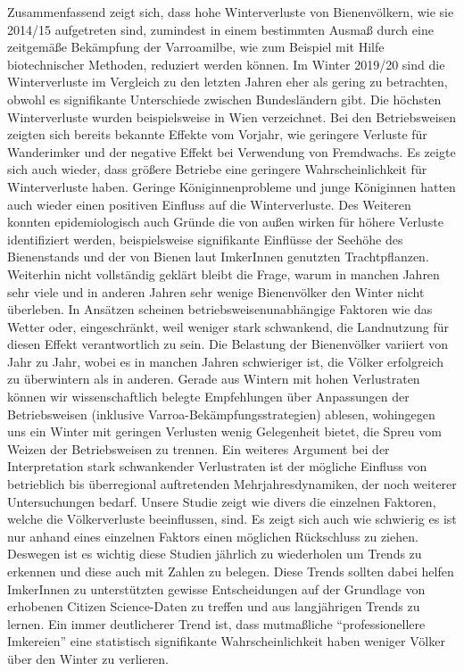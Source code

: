 Zusammenfassend zeigt sich, dass hohe Winterverluste von Bienenvölkern, wie sie 2014/15 aufgetreten sind, zumindest in einem bestimmten Ausmaß durch eine zeitgemäße Bekämpfung der Varroamilbe, wie zum Beispiel mit Hilfe biotechnischer Methoden, reduziert werden können.
\newline
Im Winter 2019/20 sind die Winterverluste im Vergleich zu den letzten Jahren eher als gering zu betrachten, obwohl es signifikante Unterschiede zwischen Bundesländern gibt. Die höchsten Winterverluste wurden beispielsweise in Wien verzeichnet. Bei den Betriebsweisen zeigten sich bereits bekannte Effekte vom Vorjahr, wie geringere Verluste für Wanderimker und der negative Effekt bei Verwendung von Fremdwachs. Es zeigte sich auch wieder, dass größere Betriebe eine geringere Wahrscheinlichkeit für Winterverluste haben.
\newline
Geringe Königinnenprobleme und junge Königinnen hatten auch wieder einen positiven Einfluss auf die Winterverluste. Des Weiteren konnten epidemiologisch auch Gründe die von außen wirken für höhere Verluste identifiziert werden, beispielsweise signifikante Einflüsse der Seehöhe des Bienenstands und der von Bienen laut ImkerInnen genutzten Trachtpflanzen.
\newline
Weiterhin nicht vollständig geklärt bleibt die Frage, warum in manchen Jahren sehr viele und in anderen Jahren sehr wenige Bienenvölker den Winter nicht überleben. In Ansätzen scheinen betriebsweisenunabhängige Faktoren wie das Wetter \citep{switanek2017} oder, eingeschränkt, weil weniger stark schwankend, die Landnutzung \citep{kuchling2018} für diesen Effekt verantwortlich zu sein.
\newline
Die Belastung der Bienenvölker variiert von Jahr zu Jahr, wobei es in manchen Jahren schwieriger ist, die Völker erfolgreich zu überwintern als in anderen. Gerade aus Wintern mit hohen Verlustraten können wir wissenschaftlich belegte Empfehlungen über Anpassungen der Betriebsweisen (inklusive Varroa-Bekämpfungsstrategien) ablesen, wohingegen uns ein Winter mit geringen Verlusten wenig Gelegenheit bietet, die Spreu vom Weizen der Betriebsweisen zu trennen. Ein weiteres Argument bei der Interpretation stark schwankender Verlustraten ist der mögliche Einfluss von betrieblich bis überregional auftretenden Mehrjahresdynamiken, der noch weiterer Untersuchungen bedarf.
\newline
Unsere Studie zeigt wie divers die einzelnen Faktoren, welche die Völkerverluste beeinflussen, sind. Es zeigt sich auch wie schwierig es ist nur anhand eines einzelnen Faktors einen möglichen Rückschluss zu ziehen. Deswegen ist es wichtig diese Studien jährlich zu wiederholen um Trends zu erkennen und diese auch mit Zahlen zu belegen. Diese Trends sollten dabei helfen ImkerInnen zu unterstützten gewisse Entscheidungen auf der Grundlage von erhobenen Citizen Science-Daten zu treffen und aus langjährigen Trends zu lernen. Ein immer deutlicherer Trend ist, dass mutmaßliche \enquote{professionellere Imkereien} eine statistisch signifikante Wahrscheinlichkeit haben weniger Völker über den Winter zu verlieren.